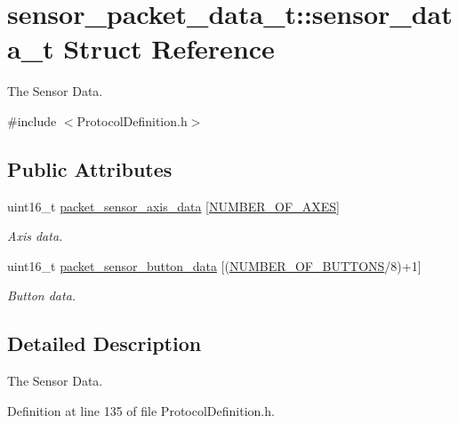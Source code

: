 \hypertarget{structsensor__packet__data__t_1_1sensor__data__t}{\section{sensor\-\_\-packet\-\_\-data\-\_\-t\-:\-:sensor\-\_\-data\-\_\-t \-Struct \-Reference}
\label{structsensor__packet__data__t_1_1sensor__data__t}
}


\-The \-Sensor \-Data.  




{\ttfamily \#include $<$\-Protocol\-Definition.\-h$>$}

\subsection*{\-Public \-Attributes}
\begin{DoxyCompactItemize}
\item 
uint16\-\_\-t \hyperlink{structsensor__packet__data__t_1_1sensor__data__t_a755dff8cc9fcb35995098d8deb79fc9b}{packet\-\_\-sensor\-\_\-axis\-\_\-data} \mbox{[}\hyperlink{_user_defines_8h_ab8c9a6337842c60c8020cd45c44ed816}{\-N\-U\-M\-B\-E\-R\-\_\-\-O\-F\-\_\-\-A\-X\-E\-S}\mbox{]}
\begin{DoxyCompactList}\small\item\em \-Axis data. \end{DoxyCompactList}\item 
uint16\-\_\-t \hyperlink{structsensor__packet__data__t_1_1sensor__data__t_a6baa8757af57519544c5961b73bdad73}{packet\-\_\-sensor\-\_\-button\-\_\-data} \mbox{[}(\hyperlink{_user_defines_8h_a8b5882947b9bdf6ffd31ba94bcc42aef}{\-N\-U\-M\-B\-E\-R\-\_\-\-O\-F\-\_\-\-B\-U\-T\-T\-O\-N\-S}/8)+1\mbox{]}
\begin{DoxyCompactList}\small\item\em \-Button data. \end{DoxyCompactList}\end{DoxyCompactItemize}


\subsection{\-Detailed \-Description}
\-The \-Sensor \-Data. 

\-Definition at line 135 of file \-Protocol\-Definition.\-h.



